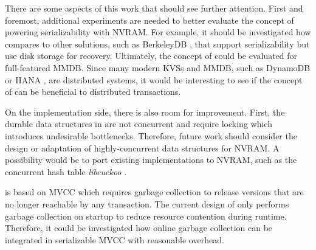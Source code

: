 There are some aspects of this work that should see further attention. First and
foremost, additional experiments are needed to better evaluate the concept of
powering serializability with NVRAM. For example, it should be investigated how
\midas compares to other solutions, such as BerkeleyDB \cite{olson1999berkeley},
that support serializability but use disk storage for recovery. Ultimately, the
concept of \midas could be evaluated for full-featured MMDB. Since many modern
\acp{KVS} and MMDB, such as DynamoDB \cite{decandia2007dynamo} or HANA
\cite{lee2013sap}, are distributed systems, it would be interesting to see if
the concept of \midas can be beneficial to distributed transactions.

On the implementation side, there is also room for improvement. First, the
durable data structures in \midas are not concurrent and require locking which
introduces undesirable bottlenecks. Therefore, future work should consider the
design or adaptation of highly-concurrent data structures for NVRAM. A
possibility would be to port existing implementations to NVRAM, such as the
concurrent hash table \emph{libcuckoo} \cite{li2014algorithmic}.

\midas is based on MVCC which requires garbage collection to release versions
that are no longer reachable by any transaction. The current design of \midas
only performs garbage collection on startup to reduce resource contention during
runtime. Therefore, it could be investigated how online garbage collection
can be integrated in serializable MVCC with reasonable overhead.
